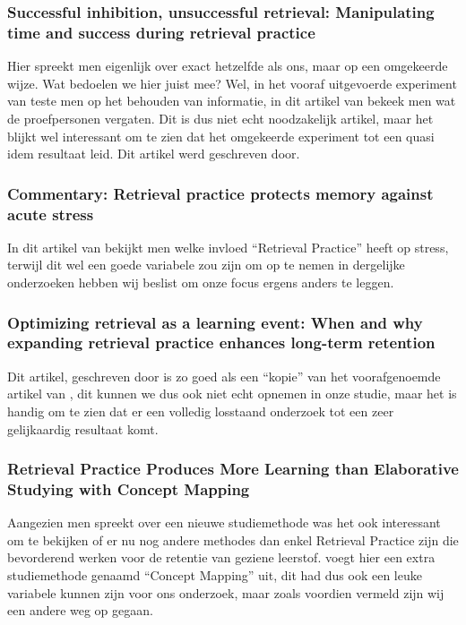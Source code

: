 \documentclass[12pt,a4paper]{article}
\begin{document}
        \subsubsection{Successful inhibition, unsuccessful retrieval: Manipulating time and success during retrieval practice}
        
        Hier spreekt men eigenlijk over exact hetzelfde als ons, maar op een omgekeerde wijze. Wat bedoelen we hier juist mee? Wel, in het vooraf uitgevoerde experiment van \cite{HenryRoediger2006} teste men op het behouden van informatie, in dit artikel van \cite{BenjaminStorm2009} bekeek men wat de proefpersonen vergaten. Dit is dus niet echt noodzakelijk artikel, maar het blijkt wel interessant om te zien dat het omgekeerde experiment tot een quasi idem resultaat leid. Dit artikel werd geschreven door. 
        
        \subsubsection{Commentary: Retrieval practice protects memory against acute stress}
        
        In dit artikel van \cite{Smith2016} bekijkt men welke invloed ``Retrieval Practice'' heeft op stress, terwijl dit wel een goede variabele zou zijn om op te nemen in dergelijke onderzoeken hebben wij beslist om onze focus ergens anders te leggen.
        
        \subsubsection{Optimizing retrieval as a learning event: When and why expanding retrieval practice enhances long-term retention}
        
        Dit artikel, geschreven door \cite{Storm2010} is zo goed als een ``kopie'' van het voorafgenoemde artikel van \cite{HenryRoediger2006}, dit kunnen we dus ook niet echt opnemen in onze studie, maar het is handig om te zien dat er een volledig losstaand onderzoek tot een zeer gelijkaardig resultaat komt. 
        
        \subsubsection{Retrieval Practice Produces More Learning than Elaborative Studying with Concept Mapping}
        
        Aangezien men spreekt over een nieuwe studiemethode was het ook interessant om te bekijken of er nu nog andere methodes dan enkel Retrieval Practice zijn die bevorderend werken voor de retentie van geziene leerstof. \cite{JeffreyKarpicke2011} voegt hier een extra studiemethode genaamd ``Concept Mapping'' uit, dit had dus ook een leuke variabele kunnen zijn voor ons onderzoek, maar zoals voordien vermeld zijn wij een andere weg op gegaan.
    
\end{document}
